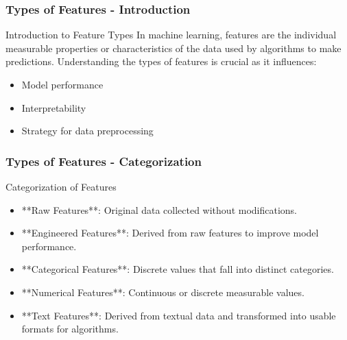 \documentclass[aspectratio=169]{beamer}
\begin{document}
\begin{frame}[fragile]
    \frametitle{Types of Features - Introduction}
    \begin{block}{Introduction to Feature Types}
        In machine learning, features are the individual measurable properties or characteristics of the data used by algorithms to make predictions. 
        Understanding the types of features is crucial as it influences:
        \begin{itemize}
            \item Model performance
            \item Interpretability
            \item Strategy for data preprocessing
        \end{itemize}
    \end{block}
\end{frame}

\begin{frame}[fragile]
    \frametitle{Types of Features - Categorization}
    \begin{block}{Categorization of Features}
        \begin{itemize}
            \item **Raw Features**: Original data collected without modifications.
            \item **Engineered Features**: Derived from raw features to improve model performance.
            \item **Categorical Features**: Discrete values that fall into distinct categories.
            \item **Numerical Features**: Continuous or discrete measurable values.
            \item **Text Features**: Derived from textual data and transformed into usable formats for algorithms.
        \end{itemize}
    \end{block}
\end{frame}
\end{document}
